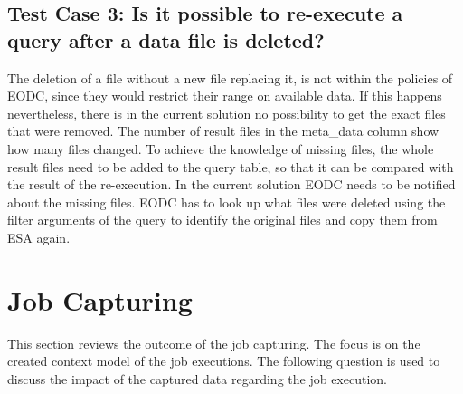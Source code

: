 \documentclass[draft,final]{vutinfth} %
\begin{document}
\subsection{Test Case 3: Is it possible to re-execute a query after a data file is deleted?}
The deletion of a file without a new file replacing it, is not within the policies of EODC, since they would restrict their range on available data. If this happens nevertheless, there is in the current solution no possibility to get the exact files that were removed. The number of result files in the meta\_data column show how many files changed. To achieve the knowledge of missing files, the whole result files need to be added to the query table, so that it can be compared with the result of the re-execution. In the current solution EODC needs to be notified about the missing files. EODC has to look up what files were deleted using the filter arguments of the query to identify the original files and copy them from ESA again. 


\section{Job Capturing}\label{Evaluation:special_jobcap}

This section reviews the outcome of the job capturing. The focus is on the created context model of the job executions. The following question is used to discuss the impact of the captured data regarding the job execution.  \\
\end{document}
